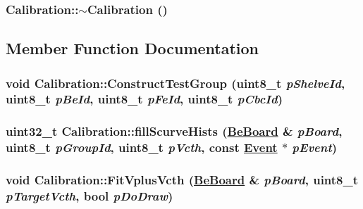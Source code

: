 \hypertarget{class_calibration_108efb6ccd8c98e5cac950be4bf0ac26}{
\subsubsection[$\sim$Calibration]{\setlength{\rightskip}{0pt plus 5cm}Calibration::$\sim$Calibration ()}}
\label{class_calibration_108efb6ccd8c98e5cac950be4bf0ac26}




\subsection{Member Function Documentation}
\hypertarget{class_calibration_6fbe71051d2006b42b0ef359bf5df44c}{
\subsubsection[ConstructTestGroup]{\setlength{\rightskip}{0pt plus 5cm}void Calibration::Construct\-Test\-Group (uint8\_\-t {\em p\-Shelve\-Id}, uint8\_\-t {\em p\-Be\-Id}, uint8\_\-t {\em p\-Fe\-Id}, uint8\_\-t {\em p\-Cbc\-Id})}}
\label{class_calibration_6fbe71051d2006b42b0ef359bf5df44c}


\hypertarget{class_calibration_e8231544cb5098450e714f98a9e66a60}{
\subsubsection[fillScurveHists]{\setlength{\rightskip}{0pt plus 5cm}uint32\_\-t Calibration::fill\-Scurve\-Hists (\hyperlink{class_ph2___hw_description_1_1_be_board}{Be\-Board} \& {\em p\-Board}, uint8\_\-t {\em p\-Group\-Id}, uint8\_\-t {\em p\-Vcth}, const \hyperlink{class_ph2___hw_interface_1_1_event}{Event} $\ast$ {\em p\-Event})}}
\label{class_calibration_e8231544cb5098450e714f98a9e66a60}


\hypertarget{class_calibration_bb8c03c4daadb9063e4ef00303eda3bd}{
\subsubsection[FitVplusVcth]{\setlength{\rightskip}{0pt plus 5cm}void Calibration::Fit\-Vplus\-Vcth (\hyperlink{class_ph2___hw_description_1_1_be_board}{Be\-Board} \& {\em p\-Board}, uint8\_\-t {\em p\-Target\-Vcth}, bool {\em p\-Do\-Draw})}}
\label{class_calibration_bb8c03c4daadb9063e4ef00303eda3bd}


